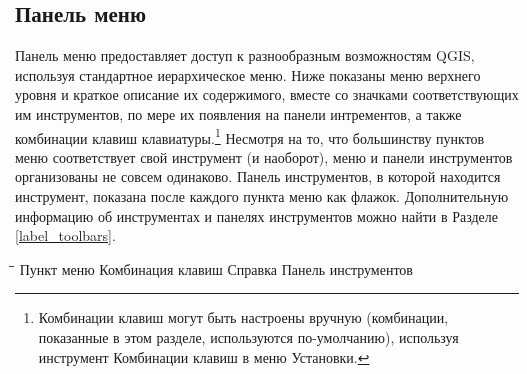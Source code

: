 \subsection{Панель меню}\label{label_menubar}

Панель меню предоставляет доступ к разнообразным возможностям QGIS, используя стандартное иерархическое меню. Ниже показаны меню верхнего уровня и краткое описание их содержимого, вместе со значками
 соответствующих им инструментов, по мере их появления на панели интрементов, а также комбинации
 клавиш клавиатуры.\footnote{Комбинации клавиш могут быть настроены вручную (комбинации, показанные
 в этом разделе, используются по-умолчанию), используя инструмент Комбинации клавиш в меню Установки.}
Несмотря на то, что большинству пунктов меню соответствует свой инструмент (и наоборот), меню и
панели инструментов организованы не совсем одинаково. Панель инструментов, в которой находится
инструмент, показана после каждого пункта меню как флажок. Дополнительную информацию об инструментах
и панелях инструментов можно найти в Разделе \ref{label_toolbars}.

\begin{tabbing}
\hspace{5.5cm}\=\hspace{3cm}\=\hspace{3.5cm}\= \kill
\hspace{1cm} Пункт меню \> Комбинация клавиш \> Справка \> Панель инструментов\\
\end{tabbing}

